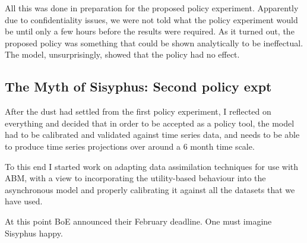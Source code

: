 \documentclass{report}
\begin{document}
All this was done in preparation for the proposed policy experiment. Apparently due to confidentiality issues, we were not told what the policy experiment would be until only a few hours before the results were required. As it turned out, the proposed policy was something that could be shown analytically to be ineffectual. The model, unsurprisingly, showed that the policy had no effect.

\subsection{The Myth of Sisyphus: Second policy expt}

After the dust had settled from the first policy experiment, I reflected on everything and decided that in order to be accepted as a policy tool, the model had to be calibrated and validated against time series data, and needs to be able to produce time series projections over around a 6 month time scale.

To this end I started work on adapting data assimilation techniques for use with ABM, with a view to incorporating the utility-based behaviour into the asynchronous model and properly calibrating it against all the datasets that we have used.

At this point BoE announced their February deadline. One must imagine Sisyphus happy.
\end{document}
